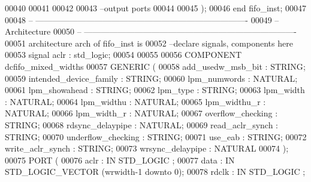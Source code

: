 \begin{DoxyCode}
00040 
00041 
00042 
00043 \textcolor{keyword}{      --output ports }
00044         
00045         \textcolor{vhdlchar}{)};
00046 \textcolor{keywordflow}{end} \textcolor{vhdlchar}{fifo\_inst};
00047 
00048 \textcolor{keyword}{-- ----------------------------------------------------------------------------}
00049 \textcolor{keyword}{-- Architecture}
00050 \textcolor{keyword}{-- ----------------------------------------------------------------------------}
00051 \textcolor{keywordflow}{architecture} arch \textcolor{keywordflow}{of} fifo_inst is
00052 \textcolor{keyword}{--declare signals,  components here}
00053 \textcolor{keywordflow}{signal} \textcolor{vhdlchar}{aclr} \textcolor{vhdlchar}{:} \textcolor{comment}{std\_logic};
00054 
00055 
00056     \textcolor{keywordflow}{COMPONENT} dcfifo\_mixed\_widths
00057     \textcolor{keywordflow}{GENERIC} (
00058         add\_usedw\_msb\_bit               : \textcolor{comment}{STRING};
00059         intended\_device\_family      : \textcolor{comment}{STRING};
00060         lpm\_numwords                    : \textcolor{comment}{NATURAL};
00061         lpm\_showahead                   : \textcolor{comment}{STRING};
00062         lpm\_type                            : \textcolor{comment}{STRING};
00063         lpm\_width                       : \textcolor{comment}{NATURAL};
00064         lpm\_widthu                      : \textcolor{comment}{NATURAL};
00065         lpm\_widthu\_r                    : \textcolor{comment}{NATURAL};
00066         lpm\_width\_r                     : \textcolor{comment}{NATURAL};
00067         overflow\_checking               : \textcolor{comment}{STRING};
00068         rdsync\_delaypipe                : \textcolor{comment}{NATURAL};
00069         read\_aclr\_synch             : \textcolor{comment}{STRING};
00070         underflow\_checking          : \textcolor{comment}{STRING};
00071         use\_eab                         : \textcolor{comment}{STRING};
00072         write\_aclr\_synch                : \textcolor{comment}{STRING};
00073         wrsync\_delaypipe                : \textcolor{comment}{NATURAL}
00074     );
00075     \textcolor{keywordflow}{PORT} (
00076             aclr        : \textcolor{keywordflow}{IN} \textcolor{comment}{STD\_LOGIC} ;
00077             data        : \textcolor{keywordflow}{IN} \textcolor{comment}{STD\_LOGIC\_VECTOR} (wrwidth\textcolor{vhdlchar}{-}\textcolor{vhdllogic}{}\textcolor{vhdllogic}{1} \textcolor{keywordflow}{downto} \textcolor{vhdllogic}{}\textcolor{vhdllogic}{0});
00078             rdclk      : \textcolor{keywordflow}{IN} \textcolor{comment}{STD\_LOGIC} ;

\end{DoxyCode}
